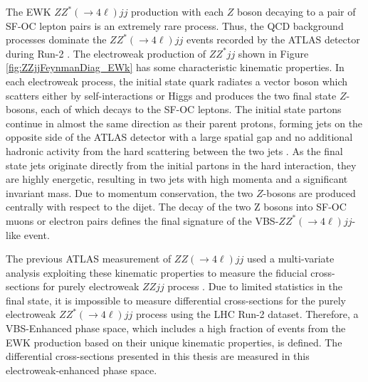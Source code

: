 The EWK $ZZ^*(\rightarrow 4\ell ) jj$ production with each $Z$ boson decaying to a pair of SF-OC lepton pairs is an extremely rare process. Thus, the QCD background processes dominate the $ZZ^*(\rightarrow 4\ell ) jj$ events recorded by the ATLAS detector during Run-2 \cite{ATLASZZjj}. The electroweak production of $ZZ^*jj$ shown in Figure \ref{fig:ZZjjFeynmanDiag_EWk} has some characteristic kinematic properties. In each electroweak process, the initial state quark radiates a vector boson which scatters either by self-interactions or Higgs and produces the two final state $Z$-bosons, each of which decays to the SF-OC leptons. The initial state partons continue in almost the same direction as their parent protons, forming jets on the opposite side of the ATLAS detector with a large spatial gap and no additional hadronic activity from the hard scattering between the two jets \cite{RapidityGapCite}. As the final state jets originate directly from the initial partons in the hard interaction, they are highly energetic, resulting in two jets with high momenta and a significant invariant mass\cite{RapidityGapCite}. Due to momentum conservation, the two $Z$-bosons are produced centrally with respect to the dijet. The decay of the two Z bosons into SF-OC muons or electron pairs defines the final signature of the VBS-$ZZ^*(\rightarrow 4\ell ) jj$-like event.

The previous ATLAS measurement of $ZZ(\rightarrow 4\ell ) jj$ used a multi-variate analysis exploiting these kinematic properties to measure the fiducial cross-sections for purely electroweak $ZZjj$ process \cite{ATLASZZjj}. Due to limited statistics in the final state, it is impossible to measure differential cross-sections for the purely electroweak $ZZ^*(\rightarrow 4\ell ) jj$ process using the LHC Run-2 dataset. Therefore, a VBS-Enhanced phase space, which includes a high fraction of events from the EWK production based on their unique kinematic properties, is defined. The differential cross-sections presented in this thesis are measured in this electroweak-enhanced phase space. 
